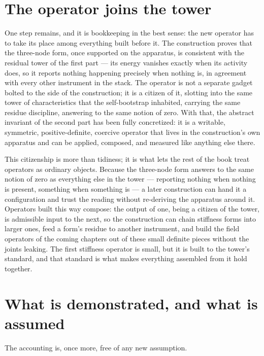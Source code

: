 \section{The operator joins the tower}
\label{se:the-operator-joins-the-tower}

One step remains, and it is bookkeeping in the best sense: the new operator has to take its place among
everything built before it. The construction proves that the three-node form, once supported on the
apparatus, is consistent with the residual tower of the first part --- its energy vanishes exactly when
its activity does, so it reports nothing happening precisely when nothing is, in agreement with every
other instrument in the stack. The operator is not a separate gadget bolted to the side of the
construction; it is a citizen of it, slotting into the same tower of characteristics that the
self-bootstrap inhabited, carrying the same residue discipline, answering to the same notion of zero.
With that, the abstract invariant of the second part has been fully concretized: it is a writable,
symmetric, positive-definite, coercive operator that lives in the construction's own apparatus and can
be applied, composed, and measured like anything else there.

This citizenship is more than tidiness; it is what lets the rest of the book treat operators as ordinary
objects. Because the three-node form answers to the same notion of zero as everything else in the tower
--- reporting nothing when nothing is present, something when something is --- a later construction can
hand it a configuration and trust the reading without re-deriving the apparatus around it. Operators
built this way compose: the output of one, being a citizen of the tower, is admissible input to the
next, so the construction can chain stiffness forms into larger ones, feed a form's residue to another
instrument, and build the field operators of the coming chapters out of these small definite pieces
without the joints leaking. The first stiffness operator is small, but it is built to the tower's
standard, and that standard is what makes everything assembled from it hold together.

\section{What is demonstrated, and what is assumed}
\label{se:demonstrated-assumed-ch15}

The accounting is, once more, free of any new assumption.

